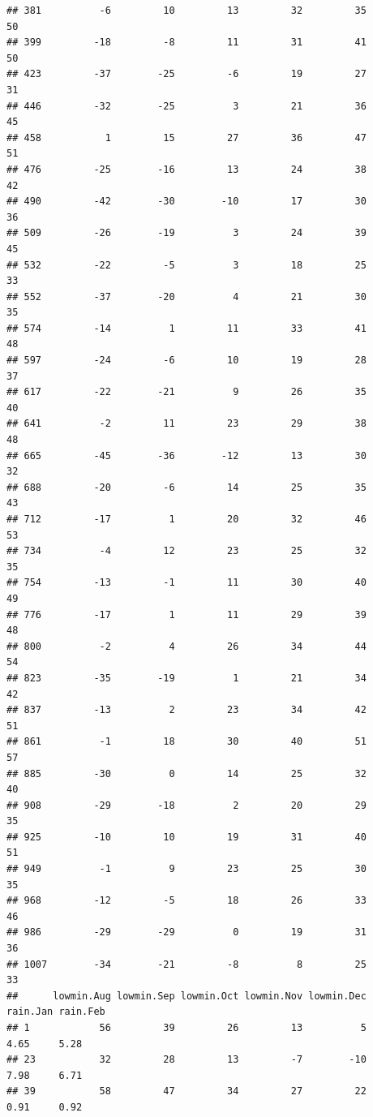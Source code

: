 \documentclass[
]{article}
\begin{document}
\begin{verbatim}
## 381          -6         10         13         32         35         50
## 399         -18         -8         11         31         41         50
## 423         -37        -25         -6         19         27         31
## 446         -32        -25          3         21         36         45
## 458           1         15         27         36         47         51
## 476         -25        -16         13         24         38         42
## 490         -42        -30        -10         17         30         36
## 509         -26        -19          3         24         39         45
## 532         -22         -5          3         18         25         33
## 552         -37        -20          4         21         30         35
## 574         -14          1         11         33         41         48
## 597         -24         -6         10         19         28         37
## 617         -22        -21          9         26         35         40
## 641          -2         11         23         29         38         48
## 665         -45        -36        -12         13         30         32
## 688         -20         -6         14         25         35         43
## 712         -17          1         20         32         46         53
## 734          -4         12         23         25         32         35
## 754         -13         -1         11         30         40         49
## 776         -17          1         11         29         39         48
## 800          -2          4         26         34         44         54
## 823         -35        -19          1         21         34         42
## 837         -13          2         23         34         42         51
## 861          -1         18         30         40         51         57
## 885         -30          0         14         25         32         40
## 908         -29        -18          2         20         29         35
## 925         -10         10         19         31         40         51
## 949          -1          9         23         25         30         35
## 968         -12         -5         18         26         33         46
## 986         -29        -29          0         19         31         36
## 1007        -34        -21         -8          8         25         33
##      lowmin.Aug lowmin.Sep lowmin.Oct lowmin.Nov lowmin.Dec rain.Jan rain.Feb
## 1            56         39         26         13          5     4.65     5.28
## 23           32         28         13         -7        -10     7.98     6.71
## 39           58         47         34         27         22     0.91     0.92

\end{verbatim}
\end{document}
